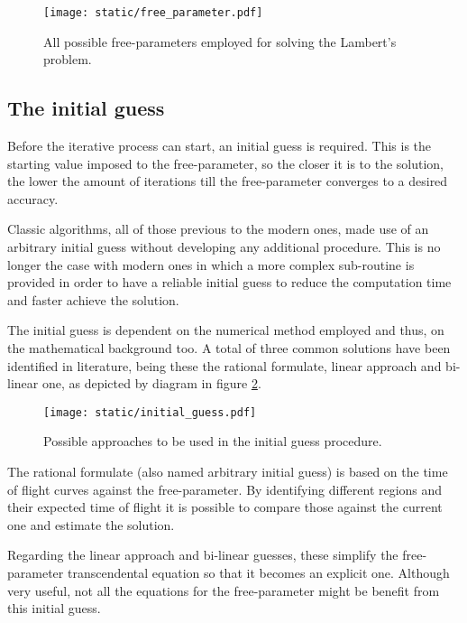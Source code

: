 \vspace{0.5cm}
\begin{figure}[h]
  \centering
  \texttt{[image: static/free\_parameter.pdf]}
  \caption[Free-parameters used in literature]{All possible free-parameters employed for solving the Lambert's problem.}
  \label{fig:free_parameter}
\end{figure}

\subsection{The initial guess}

Before the iterative process can start, an initial guess is required. This is
the starting value imposed to the free-parameter, so the closer it is to the
solution, the lower the amount of iterations till the free-parameter converges
to a desired accuracy.

Classic algorithms, all of those previous to the modern ones, made use of an
arbitrary initial guess without developing any additional procedure. This is no
longer the case with modern ones in which a more complex sub-routine is provided
in order to have a reliable initial guess to reduce the computation time and
faster achieve the solution.

The initial guess is dependent on the numerical method employed and thus, on the
mathematical background too. A total of three common solutions have been
identified in literature, being these the rational formulate, linear approach
and bi-linear one, as depicted by diagram in figure \ref{fig:initial_guess}.

\vspace{0.5cm}
\begin{figure}[h]
  \centering
  \texttt{[image: static/initial\_guess.pdf]}
  \caption[Initial guess strategies]{Possible approaches to be used in the initial guess procedure.}
  \label{fig:initial_guess}
\end{figure}

The rational formulate (also named arbitrary initial guess) is based on the time
of flight curves against the free-parameter. By identifying different regions
and their expected time of flight it is possible to compare those against the
current one and estimate the solution.

Regarding the linear approach and bi-linear guesses, these simplify the
free-parameter transcendental equation so that it becomes an explicit one.
Although very useful, not all the equations for the free-parameter might be
benefit from this initial guess.

